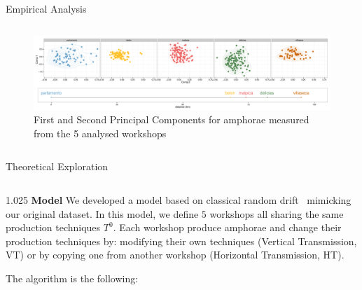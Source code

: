 \documentclass[final]{beamer}
\newlength{\onecolwid}
\newlength{\twocolwid}
\begin{document}
\begin{frame}[t]
\begin{columns}[t]
\begin{column}{\twocolwid}
\begin{block}{Empirical Analysis}
\begin{columns}[t,totalwidth=\twocolwid]
\begin{column}{\twocolwid} %
\begin{figure}
\includegraphics[width=0.6\linewidth]{images/fig2.pdf}
\singlespace
\caption{First and Second Principal Components for amphorae measured from the 5 analysed workshops}
\label{fig:pca}
\end{figure}
\end{column}
\end{columns}
\end{block}
\vspace{-1cm}
\begin{block}{Theoretical Exploration}

\begin{columns}[t,totalwidth=\twocolwid]

\begin{column}{1.025\onecolwid} %
{\textbf{Model }}
\justify
We developed a model based on classical random drift~\cite{bentley2004randomdriftandculturechange} mimicking our original dataset. In this model, we define $5$ workshops all sharing the same production techniques $T^{0}$. 
Each workshop produce amphorae and change their production techniques by:  modifying their own techniques (Vertical Transmission, VT) or by copying one from another workshop (Horizontal Transmission, HT). 

The algorithm is the following:   

\begin{center}
\end{center}
\end{column}
\end{columns}
\end{block}
\end{column}
\end{columns}
\end{frame}
\end{document}

